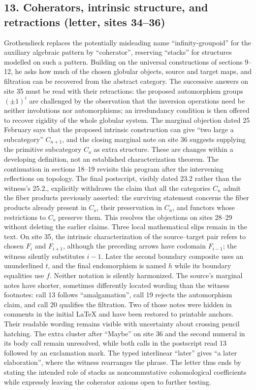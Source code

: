 \documentclass[10pt,oneside]{book}
\begin{document}
\subsection*{13. Coherators, intrinsic structure, and retractions (letter, sites 34--36)}
Grothendieck replaces the potentially misleading name ``infinity-groupoid'' for the auxiliary algebraic pattern by ``coherator'', reserving ``stacks'' for structures modelled on such a pattern. Building on the universal constructions of sections 9--12, he asks how much of the chosen globular objects, source and target maps, and filtration can be recovered from the abstract category. The successive answers on site 35 must be read with their retractions: the proposed automorphism groups $(\pm1)^i$ are challenged by the observation that the inversion operations need be neither involutions nor automorphisms; an irredundancy condition is then offered to recover rigidity of the whole globular system. The marginal objection dated 25 February says that the proposed intrinsic construction can give ``two large a subcategory'' $C_{n+1}$, and the closing marginal note on site 36 suggests supplying the primitive subcategory $C_o$ as extra structure. These are changes within a developing definition, not an established characterization theorem. The continuation in sections 18--19 revisits this program after the intervening reflections on topology. The final postscript, visibly dated 23.2 rather than the witness's 25.2., explicitly withdraws the claim that all the categories $C_n$ admit the fiber products previously asserted: the surviving statement concerns the fiber products already present in $C_o$, their preservation in $C_n$, and functors whose restrictions to $C_o$ preserve them. This resolves the objections on sites 28--29 without deleting the earlier claims. Three local mathematical slips remain in the text. On site 35, the intrinsic characterization of the source--target pair refers to chosen $F_i$ and $F_{i+1}$, although the preceding arrows have codomain $F_{i-1}$; the witness silently substitutes $i-1$. Later the second boundary composite uses an ununderlined $t$, and the final endomorphism is named $h$ while its boundary equalities use $f$. Neither notation is silently harmonized. The source's marginal notes have shorter, sometimes differently located wording than the witness footnotes: call 13 follows ``amalgamation'', call 19 rejects the automorphism claim, and call 20 qualifies the filtration. Two of those notes were hidden in comments in the initial LaTeX and have been restored to printable anchors. Their readable wording remains visible with uncertainty about crossing pencil hatching. The extra cluster after ``Maybe'' on site 36 and the second numeral in its body call remain unresolved, while both calls in the postscript read 13 followed by an exclamation mark. The typed interlinear ``later'' gives ``a later elaboration'', where the witness rearranges the phrase. The letter thus ends by stating the intended role of stacks as noncommutative cohomological coefficients while expressly leaving the coherator axioms open to further testing.
\end{document}
